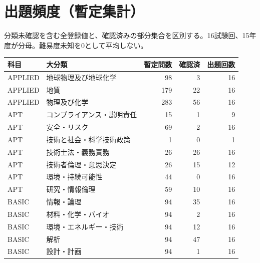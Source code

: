 \chapter{出題頻度（暫定集計）}
分類未確認を含む全登録値と、確認済みの部分集合を区別する。16試験回、15年度が分母。難易度未知を0として平均しない。
\begin{longtable}{p{.16\linewidth}p{.42\linewidth}rrr}
科目 & 大分類 & 暫定問数 & 確認済 & 出題回数\\\hline
APPLIED & 地球物理及び地球化学 & 98 & 3 & 16\\
APPLIED & 地質 & 179 & 22 & 16\\
APPLIED & 物理及び化学 & 283 & 56 & 16\\
APT & コンプライアンス・説明責任 & 15 & 1 & 9\\
APT & 安全・リスク & 69 & 2 & 16\\
APT & 技術と社会・科学技術政策 & 1 & 0 & 1\\
APT & 技術士法・義務責務 & 26 & 26 & 16\\
APT & 技術者倫理・意思決定 & 26 & 15 & 12\\
APT & 環境・持続可能性 & 44 & 0 & 16\\
APT & 研究・情報倫理 & 59 & 10 & 16\\
BASIC & 情報・論理 & 94 & 35 & 16\\
BASIC & 材料・化学・バイオ & 94 & 2 & 16\\
BASIC & 環境・エネルギー・技術 & 94 & 12 & 16\\
BASIC & 解析 & 94 & 47 & 16\\
BASIC & 設計・計画 & 94 & 1 & 16\\
\end{longtable}
